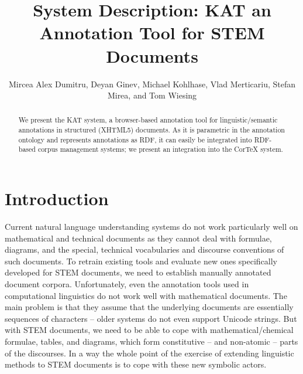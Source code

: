 \documentclass{llncs}
\title{System Description: KAT an Annotation Tool for STEM Documents}
\author{Mircea Alex Dumitru, Deyan Ginev, Michael  Kohlhase, Vlad Merticariu, Stefan
  Mirea, and Tom Wiesing}
\institute{
  Computer Science\\ Jacobs University Bremen\\
  \url{http://kwarc.info}
}
\def\sys{\textsf{KAT}\xspace}
\begin{document}
\maketitle
\begin{abstract}
  We present the \sys system, a browser-based annotation tool for linguistic/semantic
  annotations in structured (XHTML5) documents. As it is parametric in the annotation
  ontology and represents annotations as RDF, it can easily be integrated into RDF-based
  corpus management systems; we present an integration into the CorTeX system.
\end{abstract}

\section{Introduction}\label{sec:intro}

Current natural language understanding systems do not work particularly well on
mathematical and technical documents as they cannot deal with formulae, diagrams, and the
special, technical vocabularies and discourse conventions of such documents. To retrain
existing tools and evaluate new ones specifically developed for STEM documents, we need to
establish manually annotated document corpora. Unfortunately, even the annotation tools
used in computational linguistics do not work well with mathematical documents. The main
problem is that they assume that the underlying documents are essentially sequences of
characters -- older systems do not even support Unicode strings. But with STEM documents, we need to be able to cope with mathematical/chemical formulae, tables, and 
diagrams, which form constitutive -- and non-atomic -- parts of the discourses. In a way the whole point of the exercise of extending linguistic methods to STEM documents
is to cope with these new symbolic actors. 
\end{document}
